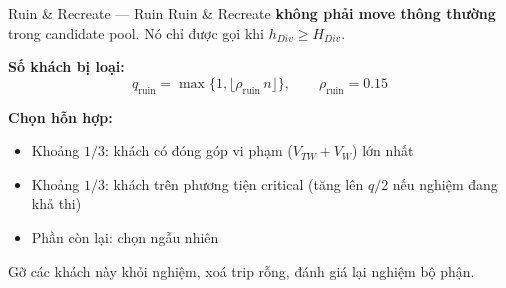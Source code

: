 \documentclass[aspectratio=169]{beamer}
\newcommand{\hl}[1]{\textcolor{blue!60!black}{\textbf{#1}}}
\begin{document}
\begin{frame}{Ruin \& Recreate — Ruin}
  \small Ruin \& Recreate \hl{không phải move thông thường} trong candidate pool. Nó chỉ được gọi khi $h_{Div} \ge H_{Div}$.

  \vspace{2mm}
  \textbf{Số khách bị loại:}
  $$q_{\text{ruin}} = \max\{1, \lfloor \rho_{\text{ruin}}\, n \rfloor\}, \qquad \rho_{\text{ruin}} = 0.15$$

  \textbf{Chọn hỗn hợp:}
  \begin{itemize}
    \item \small Khoảng $1/3$: khách có đóng góp vi phạm ($V_{TW} + V_W$) lớn nhất
    \item \small Khoảng $1/3$: khách trên phương tiện critical (tăng lên $q/2$ nếu nghiệm đang khả thi)
    \item \small Phần còn lại: chọn ngẫu nhiên
  \end{itemize}

  \vspace{1mm}
  \small Gỡ các khách này khỏi nghiệm, xoá trip rỗng, đánh giá lại nghiệm bộ phận.
\end{frame}
\end{document}
